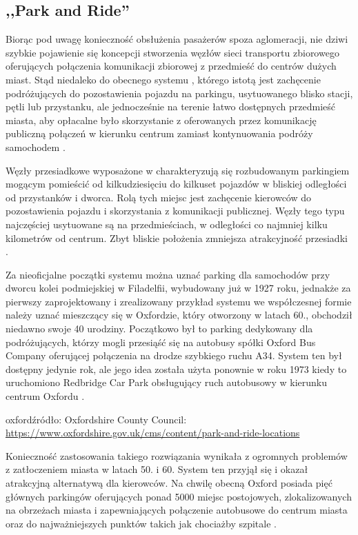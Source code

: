 \documentclass[twoside,12pt]{article}
\begin{document}
	\subsection{,,Park and Ride''}
	
	Biorąc pod uwagę konieczność obsłużenia pasażerów spoza aglomeracji, nie dziwi szybkie pojawienie się koncepcji stworzenia węzłów sieci transportu zbiorowego oferujących połączenia komunikacji zbiorowej z przedmieść do centrów dużych miast. Stąd niedaleko do obecnego systemu \pnr{}, którego istotą jest zachęcenie podróżujących do pozostawienia pojazdu na parkingu, usytuowanego blisko stacji, pętli lub przystanku, ale jednocześnie na terenie łatwo dostępnych przedmieść miasta, aby opłacalne było skorzystanie z oferowanych przez komunikację publiczną połączeń w kierunku centrum zamiast kontynuowania podróży samochodem \cite{szarata}.	
	
	Węzły przesiadkowe wyposażone w \pnr{} charakteryzują się rozbudowanym parkingiem mogącym pomieścić od kilkudziesięciu do kilkuset pojazdów w bliskiej odległości od przystanków i dworca. Rolą tych miejsc jest zachęcenie kierowców do pozostawienia pojazdu i skorzystania z komunikacji publicznej. Węzły tego typu najczęściej usytuowane są na przedmieściach, w odległości co najmniej kilku kilometrów od centrum. Zbyt bliskie położenia zmniejsza atrakcyjność przesiadki \cite{szarata}.
	
	Za nieoficjalne początki systemu \pnr{} można uznać parking dla samochodów przy dworcu kolei podmiejskiej w Filadelfii, wybudowany już w 1927 roku, jednakże za pierwszy zaprojektowany i zrealizowany przykład systemu \pnr{} we współczesnej formie należy uznać mieszczący się w Oxfordzie, który otworzony w latach 60., obchodził niedawno swoje 40 urodziny. Początkowo był to parking dedykowany dla podróżujących, którzy mogli przesiąść się na autobusy spółki Oxford Bus Company oferującej połączenia na drodze szybkiego ruchu A34. System ten był dostępny jedynie rok, ale jego idea została użyta ponownie w roku 1973 kiedy to uruchomiono Redbridge Car Park obsługujący ruch autobusowy w kierunku centrum Oxfordu \cite{oxford}.
	
	{oxford}{źródło: Oxfordshire County Council: \url{https://www.oxfordshire.gov.uk/cms/content/park-and-ride-locations}}
	
		Konieczność zastosowania takiego rozwiązania wynikała z ogromnych problemów z zatłoczeniem miasta w latach 50. i 60. System ten przyjął się i okazał atrakcyjną alternatywą dla kierowców. Na chwilę obecną Oxford posiada pięć głównych parkingów \pnr{} oferujących ponad 5000 miejsc postojowych, zlokalizowanych na obrzeżach miasta i zapewniających połączenie autobusowe do centrum miasta oraz do najważniejszych punktów takich jak chociażby szpitale \cite{oxford2}.
		
\end{document}
